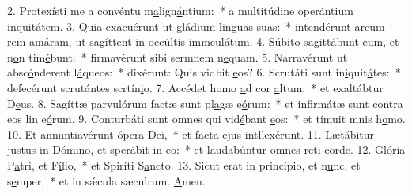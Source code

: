 2. Protexísti me a convéntu m\uline{a}lign\uline{á}ntium:~* a multitúdine operántium inquit\uline{á}tem.
3. Quia exacuérunt ut gládium l\uline{i}nguas s\uline{u}as:~* intendérunt arcum rem amáram, ut sagíttent in occúltis immcul\uline{á}tum.
4. Súbito sagittábunt eum, et n\uline{o}n tim\uline{é}bunt:~* firmavérunt sibi sermnem n\uline{e}quam.
5. Narravérunt ut absc\uline{ó}nderent l\uline{á}queos:~* dixérunt: Quis vidbit \uline{e}os?
6. Scrutáti sunt in\uline{i}quit\uline{á}tes:~* defecérunt scrutántes scrtín\uline{i}o.
7. Accédet homo \uline{a}d cor \uline{a}ltum:~* et exaltábtur D\uline{e}us.
8. Sagíttæ parvulórum factæ sunt pl\uline{a}gæ e\uline{ó}rum:~* et infirmátæ sunt contra eos lin e\uline{ó}rum.
9. Conturbáti sunt omnes qui vid\uline{é}bant \uline{e}os:~* et tímuit mnis h\uline{o}mo.
10. Et annuntiavérunt \uline{ó}pera D\uline{e}i,~* et facta ejus intllex\uline{é}runt.
11. Lætábitur justus in Dómino, et sper\uline{á}bit in \uline{e}o:~* et laudabúntur omnes rcti c\uline{o}rde.
12. Glória P\uline{a}tri, et F\uline{í}lio,~* et Spiríti S\uline{a}ncto.
13. Sicut erat in princípio, et n\uline{u}nc, et s\uline{e}mper,~* et in sǽcula sæculrum. \uline{A}men.

